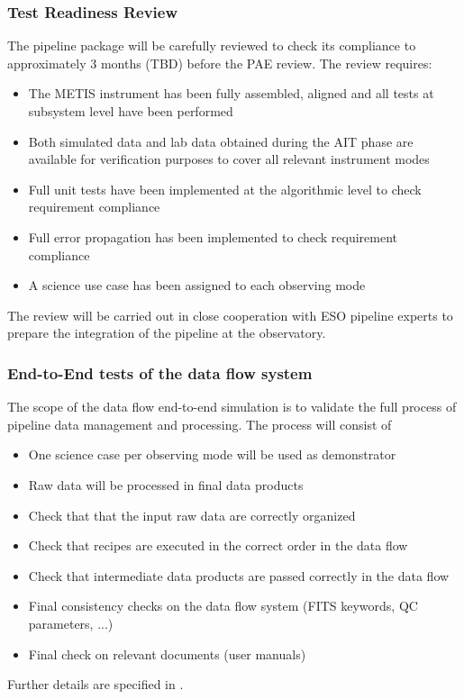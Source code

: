 \subsubsection{Test Readiness Review}
\label{sssec:trr}

The pipeline package will be carefully reviewed to check its compliance to \cite{1618} approximately 3 months (TBD) before the PAE review. The review requires:
\begin{itemize}
    \item The METIS instrument has been fully assembled, aligned and all tests at subsystem level have been performed
    \item Both simulated data and lab data obtained during the AIT phase are available for verification purposes to cover all relevant instrument modes
    \item Full unit tests have been implemented at the algorithmic level to check requirement compliance
    \item Full error propagation has been implemented to check requirement compliance
    \item A science use case has been assigned to each observing mode
\end{itemize}
The review will be carried out in close cooperation with ESO pipeline experts to prepare the integration of the pipeline at the observatory.

\subsubsection{End-to-End tests of the data flow system}
\label{sssec:e2e}

The scope of the data flow end-to-end simulation is to validate the full process of pipeline data management and processing. The process will consist of
\begin{itemize}
    \item One science case per observing mode will be used as demonstrator
    \item Raw data will be processed in final data products
    \item Check that that the input raw data are correctly organized
    \item Check that recipes are executed in the correct order in the data flow
    \item Check that intermediate data products are passed correctly in the data flow
    \item Final consistency checks on the data flow system (FITS keywords, QC parameters, ...)
    \item Final check on relevant documents (user manuals)
\end{itemize}
Further details are specified in \cite{DRLVT}.


